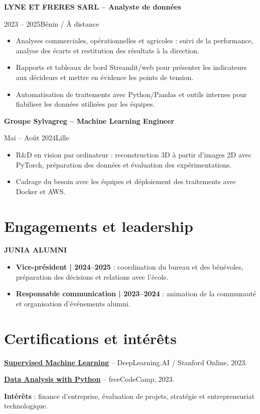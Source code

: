 \documentclass[10pt,a4paper]{article}
\newcommand{\role}[3]{\vspace{4pt}\textbf{#1}\par {\color{muted}#2\enspace\textbullet\enspace #3}\par}
\begin{document}
{\begin{minipage}[t]{0.68\textwidth}
\role{LYNE ET FRERES SARL -- Analyste de données}{2023 -- 2025}{Bénin / À distance}
\begin{itemize}
\item Analyses commerciales, opérationnelles et agricoles : suivi de la performance, analyse des écarts et restitution des résultats à la direction.
\item Rapports et tableaux de bord Streamlit/web pour présenter les indicateurs aux décideurs et mettre en évidence les points de tension.
\item Automatisation de traitements avec Python/Pandas et outils internes pour fiabiliser les données utilisées par les équipes.
\end{itemize}

\role{Groupe Sylvagreg -- Machine Learning Engineer}{Mai -- Août 2024}{Lille}
\begin{itemize}
\item R\&D en vision par ordinateur : reconstruction 3D à partir d'images 2D avec PyTorch, préparation des données et évaluation des expérimentations.
\item Cadrage du besoin avec les équipes et déploiement des traitements avec Docker et AWS.
\end{itemize}

\section{Engagements et leadership}
\textbf{JUNIA ALUMNI}\par
\begin{itemize}
\item \textbf{Vice-président | 2024--2025} : coordination du bureau et des bénévoles, préparation des décisions et relations avec l'école.
\item \textbf{Responsable communication | 2023--2024} : animation de la communauté et organisation d'événements alumni.
\end{itemize}

\section{Certifications et intérêts}
\href{https://www.coursera.org/account/accomplishments/verify/MWJS4Q3S2C3L}{\textbf{Supervised Machine Learning}} -- DeepLearning.AI / Stanford Online, 2023.\par
\href{https://www.freecodecamp.org/certification/amiche/data-analysis-with-python-v7}{\textbf{Data Analysis with Python}} -- freeCodeCamp, 2023.\par
\vspace{3pt}
\textbf{Intérêts} : finance d'entreprise, évaluation de projets, stratégie et entrepreneuriat technologique.
\end{minipage}}
\end{document}
